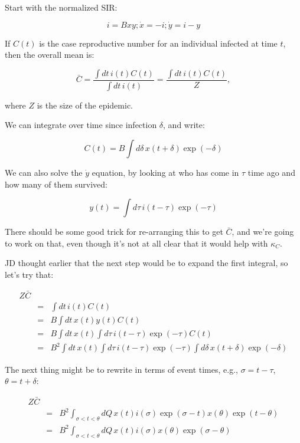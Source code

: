 \documentclass[12pt]{article}
\begin{document}
Start with the normalized SIR:

$$ i = Bxy; \dot x = -i; \dot y = i-y $$

If $C(t)$ is the case reproductive number for an individual infected at time $t$, then the overall mean is:

$$
	\bar C 
	= \frac{\int{dt\, i(t) C(t)}}{\int{dt\, i(t)}}
	= \frac{\int{dt\, i(t) C(t)}}{Z}, 
$$

where $Z$ is the size of the epidemic.

We can integrate over time since infection $\delta$, and write:

$$C(t) = B \int{d\delta\, x(t+\delta) \exp(-\delta)}$$

We can also solve the $\dot y$ equation, by looking at who has come in $\tau$ time ago and how many of them survived:

$$ y(t) = \int{d\tau\, i(t-\tau)\exp(-\tau)}$$

There should be some good trick for re-arranging this to get $\bar C$, and we're going to work on that, even though it's not at all clear that it would help with $\kappa_C$.

JD thought earlier that the next step would be to expand the first integral, so let's try that:

\begin{eqnarray}
	Z \bar C \\
	&=& \int{dt\, i(t) C(t)} \\
	&=& B \int{dt\, x(t) y(t) C(t)} \\
	&=& B \int{dt\, x(t) \int{d\tau\, i(t-\tau)\exp(-\tau)} C(t)} \\
	&=& B^2 \int{dt\, x(t) \int{d\tau\, i(t-\tau)\exp(-\tau)} \int{d\delta\, x(t+\delta) \exp(-\delta)}}
\end{eqnarray}

The next thing might be to rewrite in terms of event times, e.g., $\sigma=t-\tau$, $\theta=t+\delta$:

\begin{eqnarray}
	Z \bar C
	\\ &=& B^2 \int_{\sigma<t<\theta}{dQ\, x(t) i(\sigma)\exp(\sigma-t) x(\theta) \exp(t-\theta)}
	\\ &=& B^2 \int_{\sigma<t<\theta}{dQ\, x(t) i(\sigma) x(\theta) \exp(\sigma-\theta)}
\end{eqnarray}
\end{document}
